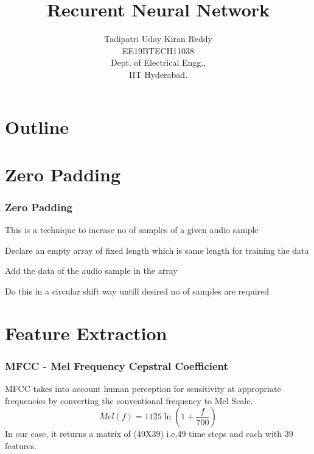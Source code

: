 \documentclass{beamer}
\title{Recurent Neural Network}
\author{Tadipatri Uday Kiran Reddy\\EE19BTECH11038 \\ Dept. of Electrical Engg.,\\IIT Hyderabad.}
\theoremstyle{remark}
\numberwithin{equation}{section}
\begin{document}
\begin{frame}
\titlepage
\end{frame}

\section*{Outline}
\begin{frame}
\tableofcontents
\end{frame}
\section{Zero Padding}
\begin{frame}
\frametitle{Zero Padding}
This is a technique to incrase no of samples of a given audio sample
\begin{description}[font=$\bullet$~\normalfont\scshape\color{red!50!black}]
\item [] Declare an empty array of fixed length which is same length for training the data
\item [] Add the data of the audio sample in the array
\item [] Do this in a circular shift way untill desired no of samples are required
\end{description}

\end{frame}

\section{Feature Extraction}
\begin{frame}
\frametitle{MFCC - Mel Frequency Cepstral Coefficient}
 MFCC takes into account human perception for sensitivity at appropriate frequencies by converting the conventional frequency to Mel Scale.\\
 \begin{equation*}
     Mel(f) = 1125\ln({1 + \frac{f}{700}})
 \end{equation*}
 In our case, it returns a matrix of (49X39) i.e,49 time steps and each with 39 features.
\end{frame}
\end{document}

